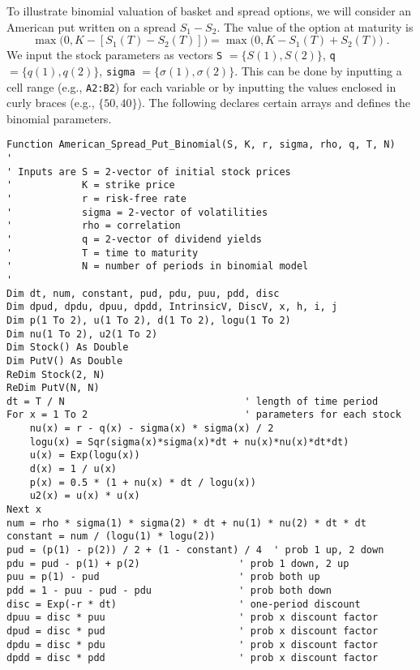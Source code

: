 To illustrate binomial valuation of basket and spread options, we will consider an American put written on a spread $S_1 - S_2$.  The value of the option at maturity is 
$$\max\big(0,K-[S_1(T)-S_2(T)]\big) = \max\big(0,K-S_1(T)+S_2(T)\big)\; .$$
We input the stock parameters as vectors \verb!S! $=\{S(1),S(2)\}$, \verb!q! $= \{q(1),q(2)\}$, \verb!sigma! $=\{\sigma(1),\sigma(2)\}$.  This can be done by inputting a cell range (e.g., \verb!A2:B2!) for each variable  or by inputting the values enclosed in curly braces (e.g., $\{50,40\}$).  The following declares certain arrays and defines the binomial parameters.
\small\begin{verbatim}
Function American_Spread_Put_Binomial(S, K, r, sigma, rho, q, T, N)
'
' Inputs are S = 2-vector of initial stock prices
'            K = strike price
'            r = risk-free rate
'            sigma = 2-vector of volatilities
'            rho = correlation
'            q = 2-vector of dividend yields
'            T = time to maturity
'            N = number of periods in binomial model
'
Dim dt, num, constant, pud, pdu, puu, pdd, disc
Dim dpud, dpdu, dpuu, dpdd, IntrinsicV, DiscV, x, h, i, j
Dim p(1 To 2), u(1 To 2), d(1 To 2), logu(1 To 2)
Dim nu(1 To 2), u2(1 To 2)
Dim Stock() As Double
Dim PutV() As Double
ReDim Stock(2, N)
ReDim PutV(N, N)
dt = T / N                               ' length of time period
For x = 1 To 2                           ' parameters for each stock
    nu(x) = r - q(x) - sigma(x) * sigma(x) / 2
    logu(x) = Sqr(sigma(x)*sigma(x)*dt + nu(x)*nu(x)*dt*dt)
    u(x) = Exp(logu(x))
    d(x) = 1 / u(x)
    p(x) = 0.5 * (1 + nu(x) * dt / logu(x))
    u2(x) = u(x) * u(x)
Next x
num = rho * sigma(1) * sigma(2) * dt + nu(1) * nu(2) * dt * dt
constant = num / (logu(1) * logu(2))
pud = (p(1) - p(2)) / 2 + (1 - constant) / 4  ' prob 1 up, 2 down
pdu = pud - p(1) + p(2)                 ' prob 1 down, 2 up
puu = p(1) - pud                        ' prob both up
pdd = 1 - puu - pud - pdu               ' prob both down
disc = Exp(-r * dt)                     ' one-period discount 
dpuu = disc * puu                       ' prob x discount factor
dpud = disc * pud                       ' prob x discount factor
dpdu = disc * pdu                       ' prob x discount factor
dpdd = disc * pdd                       ' prob x discount factor
\end{verbatim}\normalsize

